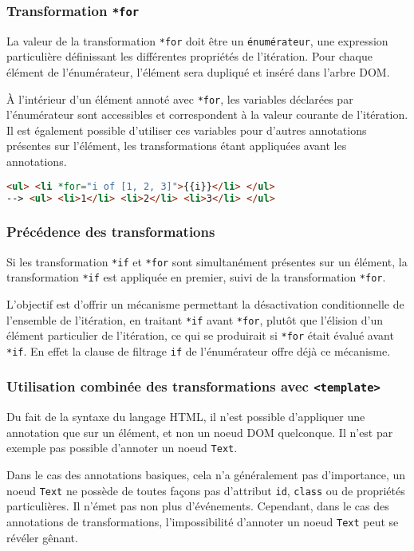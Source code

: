 \subsubsection{Transformation \texttt{*for}}
La valeur de la transformation \texttt{*for} doit être un \texttt{énumérateur}, une expression particulière définissant les différentes propriétés de l'itération. Pour chaque élément de l'énumérateur, l'élément sera dupliqué et inséré dans l'arbre DOM.

À l'intérieur d'un élément annoté avec \texttt{*for}, les variables déclarées par l'énumérateur sont accessibles et correspondent à la valeur courante de l'itération. Il est également possible d'utiliser ces variables pour d'autres annotations présentes sur l'élément, les transformations étant appliquées avant les annotations.

\begin{lstlisting}[language=HTML]
<ul> <li *for="i of [1, 2, 3]">{{i}}</li> </ul>
--> <ul> <li>1</li> <li>2</li> <li>3</li> </ul>
\end{lstlisting}

\subsubsection{Précédence des transformations}
Si les transformation \texttt{*if} et \texttt{*for} sont simultanément présentes sur un élément, la transformation \texttt{*if} est appliquée en premier, suivi de la transformation \texttt{*for}.

L'objectif est d'offrir un mécanisme permettant la désactivation conditionnelle de l'ensemble de l'itération, en traitant \texttt{*if} avant \texttt{*for}, plutôt que l'élision d'un élément particulier de l'itération, ce qui se produirait si \texttt{*for} était évalué avant \texttt{*if}. En effet la clause de filtrage \texttt{if} de l'énumérateur offre déjà ce mécanisme.

\subsubsection{Utilisation combinée des transformations avec \texttt{<template>}}
Du fait de la syntaxe du langage HTML, il n'est possible d'appliquer une annotation que sur un élément, et non un noeud DOM quelconque. Il n'est par exemple pas possible d'annoter un noeud \texttt{Text}.

Dans le cas des annotations basiques, cela n'a généralement pas d'importance, un noeud \texttt{Text} ne possède de toutes façons pas d'attribut \texttt{id}, \texttt{class} ou de propriétés particulières. Il n'émet pas non plus d'événements. Cependant, dans le cas des annotations de transformations, l'impossibilité d'annoter un noeud \texttt{Text} peut se révéler gênant.

